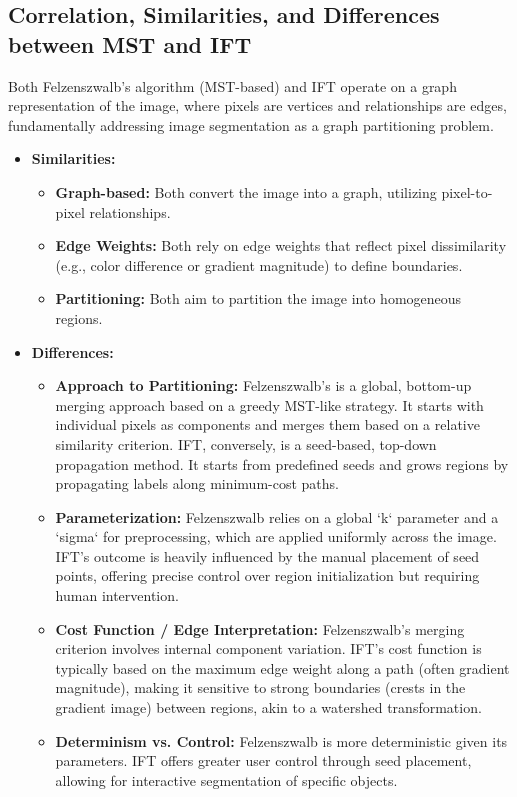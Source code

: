 \documentclass{sbc2023}
\begin{document}
\subsection{Correlation, Similarities, and Differences between MST and IFT}
Both Felzenszwalb's algorithm (MST-based) and IFT operate on a graph representation of the image, where pixels are vertices and relationships are edges, fundamentally addressing image segmentation as a graph partitioning problem.

\begin{itemize}
    \item \textbf{Similarities:}
    \begin{itemize}
        \item \textbf{Graph-based:} Both convert the image into a graph, utilizing pixel-to-pixel relationships.
        \item \textbf{Edge Weights:} Both rely on edge weights that reflect pixel dissimilarity (e.g., color difference or gradient magnitude) to define boundaries.
        \item \textbf{Partitioning:} Both aim to partition the image into homogeneous regions.
    \end{itemize}
    \item \textbf{Differences:}
    \begin{itemize}
        \item \textbf{Approach to Partitioning:} Felzenszwalb's is a global, bottom-up merging approach based on a greedy MST-like strategy. It starts with individual pixels as components and merges them based on a relative similarity criterion. IFT, conversely, is a seed-based, top-down propagation method. It starts from predefined seeds and grows regions by propagating labels along minimum-cost paths.
        \item \textbf{Parameterization:} Felzenszwalb relies on a global `k` parameter and a `sigma` for preprocessing, which are applied uniformly across the image. IFT's outcome is heavily influenced by the manual placement of seed points, offering precise control over region initialization but requiring human intervention.
        \item \textbf{Cost Function / Edge Interpretation:} Felzenszwalb's merging criterion involves internal component variation. IFT's cost function is typically based on the maximum edge weight along a path (often gradient magnitude), making it sensitive to strong boundaries (crests in the gradient image) between regions, akin to a watershed transformation.
        \item \textbf{Determinism vs. Control:} Felzenszwalb is more deterministic given its parameters. IFT offers greater user control through seed placement, allowing for interactive segmentation of specific objects.
    \end{itemize}
\end{itemize}
\end{document}
